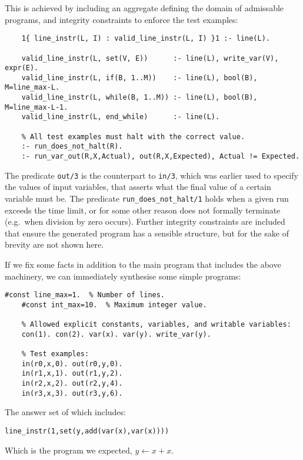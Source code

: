 \documentclass[a4paper,twoside,notitlepage]{article}
\newcommand{\ttt}{\texttt}
\begin{document}
This is achieved by including an aggregate defining the domain of 
admissable programs, and integrity constraints to enforce the test 
examples:
\begin{Verbatim}[samepage=true]
    % Exactly one instruction per line.
    1{ line_instr(L, I) : valid_line_instr(L, I) }1 :- line(L).
    
    valid_line_instr(L, set(V, E))      :- line(L), write_var(V), expr(E).
    valid_line_instr(L, if(B, 1..M))    :- line(L), bool(B), M=line_max-L.
    valid_line_instr(L, while(B, 1..M)) :- line(L), bool(B), M=line_max-L-1.
    valid_line_instr(L, end_while)      :- line(L).
    
    % All test examples must halt with the correct value.
    :- run_does_not_halt(R).
    :- run_var_out(R,X,Actual), out(R,X,Expected), Actual != Expected.
\end{Verbatim}
The predicate \ttt{out/3} is the counterpart to \ttt{in/3}, which was 
earlier used to specify the values of input variables, that asserts what 
the final value of a certain variable must be. The predicate 
\ttt{run\_does\_not\_halt/1} holds when a given run exceeds the time 
limit, or for some other reason does not formally terminate (e.g.\ when 
division by zero occurs). Further integrity constraints are included that 
ensure the generated program has a sensible structure, but for the sake of 
brevity are not shown here.

If we fix some facts in addition to the main program that includes the 
above machinery, we can immediately synthesise some simple programs:
\begin{Verbatim}[samepage=true]
    #const line_max=1.  % Number of lines.
    #const int_max=10.  % Maximum integer value.

    % Allowed explicit constants, variables, and writable variables:
    con(1). con(2). var(x). var(y). write_var(y).
    
    % Test examples:
    in(r0,x,0). out(r0,y,0).
    in(r1,x,1). out(r1,y,2).
    in(r2,x,2). out(r2,y,4).
    in(r3,x,3). out(r3,y,6).
\end{Verbatim}
The answer set of which includes:
\begin{Verbatim}[samepage=true]
    line_instr(1,set(y,add(var(x),var(x))))
\end{Verbatim}
Which is the program we expected, $y \gets x + x$.
\end{document}
